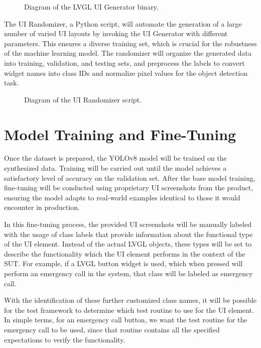 \documentclass[Proposal,BIC,english,IEEE]{BASE/twbook} %
\begin{document}
\begin{figure}[!htbp]
    \centering
    
    \caption{Diagram of the LVGL UI Generator binary.}\label{Fig2}
\end{figure}
\newpage
The UI Randomizer, a Python script, will automate the generation of a large number of varied UI layouts by invoking the UI Generator with different parameters. This ensures a diverse training set, which is crucial for the robustness of the machine learning model. The randomizer will organize the generated data into training, validation, and testing sets, and preprocess the labels to convert widget names into class IDs and normalize pixel values for the object detection task.

\begin{figure}[!htbp]
    \centering
    
    \caption{Diagram of the UI Randomizer script.}\label{Fig3}
\end{figure}


\section{Model Training and Fine-Tuning}
Once the dataset is prepared, the YOLOv8 model will be trained on the synthesized data. Training will be carried out until the model achieves a satisfactory level of accuracy on the validation set. After the base model training, fine-tuning will be conducted using proprietary UI screenshots from the product, ensuring the model adapts to real-world examples identical to those it would encounter in production.

In this fine-tuning process, the provided UI screenshots will be manually labeled with the usage of class labels that provide information about the functional type of the UI element. Instead of the actual LVGL objects, these types will be set to describe the functionality which the UI element performs in the context of the SUT. For example, if a LVGL button widget is used, which when pressed will perform an emergency call in the system, that class will be labeled as emergency call.

With the identification of these further customized class names, it will be possible for the test framework to determine which test routine to use for the UI element. In simple terms, for an emergency call button, we want the test routine for the emergency call to be used, since that routine contains all the specified expectations to verify the functionality.
\end{document}
